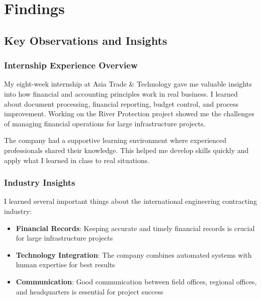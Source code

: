 
\chapter{Findings}

\section{Key Observations and Insights}

\subsection{Internship Experience Overview}
My eight-week internship at Asia Trade \& Technology gave me valuable insights into how financial and accounting principles work in real business. I learned about document processing, financial reporting, budget control, and process improvement. Working on the River Protection project showed me the challenges of managing financial operations for large infrastructure projects.

The company had a supportive learning environment where experienced professionals shared their knowledge. This helped me develop skills quickly and apply what I learned in class to real situations.

\vspace{0.3em}
\subsection{Industry Insights}
I learned several important things about the international engineering contracting industry:

\begin{itemize}[leftmargin=*, itemsep=0.25em]
    \item \textbf{Financial Records}: Keeping accurate and timely financial records is crucial for large infrastructure projects
    \item \textbf{Technology Integration}: The company combines automated systems with human expertise for best results
    \item \textbf{Communication}: Good communication between field offices, regional offices, and headquarters is essential for project success
\end{itemize}

